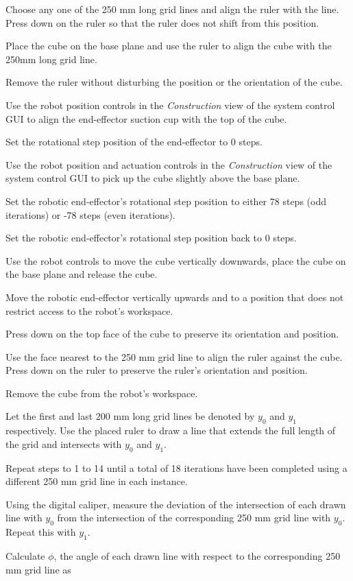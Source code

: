 \begin{compactenum}
	\item Choose any one of the 250 mm long grid lines and align the ruler with the line. Press down on the ruler so that the ruler does not shift from this position.
	\item Place the cube on the base plane and use the ruler to align the cube with the 250mm long grid line.
	\item Remove the ruler without disturbing the position or the orientation of the cube.
	\item Use the robot position controls in the \textit{Construction} view of the system control GUI to align the end-effector suction cup with the top of the cube.
	\item Set the rotational step position of the end-effector to 0 steps.
	\item Use the robot position and actuation controls in the \textit{Construction} view of the system control GUI to pick up the cube slightly above the base plane.
	\item Set the robotic end-effector's rotational step position to either 78 steps (odd iterations) or -78 steps (even iterations).
	\item Set the robotic end-effector's rotational step position back to 0 steps.
	\item Use the robot controls to move the cube vertically downwards, place the cube on the base plane and release the cube.
	\item Move the robotic end-effector vertically upwards and to a position that does not restrict access to the robot's workspace.
	\item Press down on the top face of the cube to preserve its orientation and position. 
	\item Use the face nearest to the 250 mm grid line to align the ruler against the cube. Press down on the ruler to preserve the ruler's orientation and position.
	\item Remove the cube from the robot's workspace.
	\item Let the first and last 200 mm long grid lines be denoted by $y_0$ and $y_1$ respectively. Use the placed ruler to draw a line that extends the full length of the grid and intersects with $y_0$ and $y_1$.
	\item Repeat steps to 1 to 14 until a total of 18 iterations have been completed using a different 250 mm grid line in each instance.
	\item Using the digital caliper, measure the deviation of the intersection of each drawn line with $y_0$ from the intersection of the corresponding 250 mm grid line with $y_0$. Repeat this with $y_1$.
	\item Calculate $\phi$, the angle of each drawn line with respect to the corresponding 250 mm grid line as
	

\end{compactenum}
